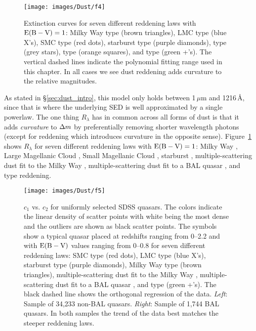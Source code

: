 \begin{figure}[t]
\begin{center}
\texttt{[image: images/Dust/f4]}
\caption[Dust extinction curves]{ \label{fig:ecurves} Extinction curves for seven different reddening laws with ${\rm E(B-V)}=1$: Milky Way type (brown triangles), LMC type (blue X's), SMC type (red dots), starburst type (purple diamonds), \citet{Goobar:2008} type (grey stars), \citet{Leighly:2014} type (orange squares), and \citet{Gaskell:2004} type (green +'s). The vertical dashed lines indicate the polynomial fitting range used in this chapter. In all cases we see dust reddening adds curvature to the relative magnitudes.}
\end{center}
\end{figure}

As stated in \S\ref{sec:dust_intro}, this model only holds between 1\,$\mu$m and 1216\,\AA, since that is where the underlying SED is well approximated by a single powerlaw.  The one thing $R_{\lambda}$ has in common across all forms of dust is that it adds {\em curvature} to $\Delta m$ by preferentially removing shorter wavelength photons (except for \citealt{Gaskell:2004} reddening which introduces curvature in the opposite sense).
Figure~\ref{fig:ecurves} shows $R_{\lambda}$ for seven different reddening laws with ${\rm E(B-V)}=1$:  Milky Way \citep[MW;][]{Pei:1992}, Large Magellanic Cloud \citep[LMC;][]{Pei:1992}, Small Magellanic Cloud \citep[SMC;][]{Pei:1992}, starburst \citep[CAL;][]{Calzetti:1995}, multiple-scattering dust fit to the Milky Way \citep[G08-MW;][]{Goobar:2008}, multiple-scattering dust fit to a BAL quasar \citep[L14-QSO;][]{Leighly:2014}, and \citet[G04;][]{Gaskell:2004} type reddening.

\begin{figure*}%
\begin{center}
\texttt{[image: images/Dust/f5]}
\caption[$c_1$ vs. $c_2$]{ \label{fig:c1c2} $c_1$ vs. $c_2$ for uniformly selected SDSS quasars.  The colors indicate the linear density of scatter points with white being the most dense and the outliers are shown as black scatter points.  The symbols show a typical quasar placed at redshifts ranging from 0--2.2 and with ${\rm E(B-V)}$ values ranging from 0--0.8 for seven different reddening laws: SMC type (red dots), LMC type (blue X's), starburst type (purple diamonds), Milky Way type (brown triangles), multiple-scattering dust fit to the Milky Way \citep[grey stars][]{Goobar:2008}, multiple-scattering dust fit to a BAL quasar \citep[orange squares][]{Leighly:2014}, and \citet{Gaskell:2004} type (green +'s).  The black dashed line shows the orthogonal regression of the data.  {\em Left}: Sample of 34,233 non-BAL quasars. {\em Right}: Sample of 1,744 BAL quasars.  In both samples the trend of the data best matches the steeper reddening laws.}
\end{center}
\end{figure*}

